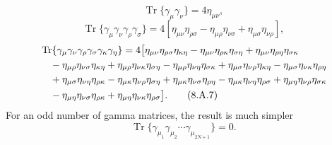 \begin{equation}
\operatorname{Tr}\{\gamma_\mu\gamma_\nu\}=4\eta_{\mu\nu},
\tag{8.A.5}\label{eq:8.A.5}
\end{equation}
\begin{equation}
\operatorname{Tr}\{\gamma_\mu\gamma_\nu\gamma_\rho\gamma_\sigma\}
=4[\eta_{\mu\nu}\eta_{\rho\sigma}
-\eta_{\mu\rho}\eta_{\nu\sigma}
+\eta_{\mu\sigma}\eta_{\nu\rho}],
\tag{8.A.6}\label{eq:8.A.6}
\end{equation}
\begin{align}
&\operatorname{Tr}\{\gamma_\mu\gamma_\nu\gamma_\rho\gamma_\sigma
\gamma_\kappa\gamma_\eta\}=4\bigl[
\eta_{\mu\nu}\eta_{\rho\sigma}\eta_{\kappa\eta}
-\eta_{\mu\nu}\eta_{\rho\kappa}\eta_{\sigma\eta}
+\eta_{\mu\nu}\eta_{\rho\eta}\eta_{\sigma\kappa}
\notag\\
&\quad-\eta_{\mu\rho}\eta_{\nu\sigma}\eta_{\kappa\eta}
+\eta_{\mu\rho}\eta_{\nu\kappa}\eta_{\sigma\eta}
-\eta_{\mu\rho}\eta_{\nu\eta}\eta_{\sigma\kappa}
+\eta_{\mu\sigma}\eta_{\nu\rho}\eta_{\kappa\eta}
-\eta_{\mu\sigma}\eta_{\nu\kappa}\eta_{\rho\eta}
\notag\\
&\quad+\eta_{\mu\sigma}\eta_{\nu\eta}\eta_{\rho\kappa}
-\eta_{\mu\kappa}\eta_{\nu\rho}\eta_{\sigma\eta}
+\eta_{\mu\kappa}\eta_{\nu\sigma}\eta_{\rho\eta}
-\eta_{\mu\kappa}\eta_{\nu\eta}\eta_{\rho\sigma}
+\eta_{\mu\eta}\eta_{\nu\rho}\eta_{\sigma\kappa}
\notag\\
&\quad-\eta_{\mu\eta}\eta_{\nu\sigma}\eta_{\rho\kappa}
+\eta_{\mu\eta}\eta_{\nu\kappa}\eta_{\rho\sigma}\bigr].
\tag{8.A.7}\label{eq:8.A.7}
\end{align}
For an odd number of gamma matrices, the result is much simpler
\begin{equation}
\operatorname{Tr}\{\gamma_{\mu_1}\gamma_{\mu_2}\cdots
\gamma_{\mu_{2N+1}}\}=0.
\tag{8.A.8}\label{eq:8.A.8}
\end{equation}

